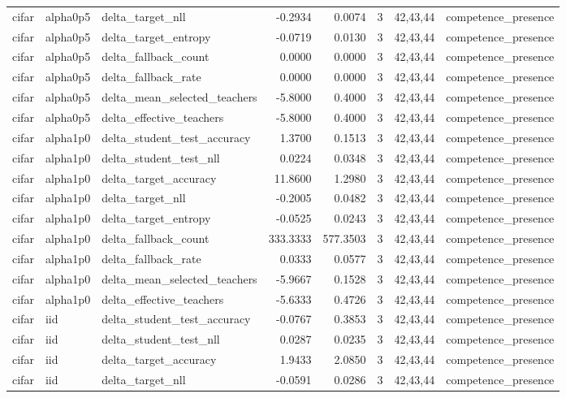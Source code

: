 \begin{tabular}{lllrrrll}
cifar & alpha0p5 & delta\_target\_nll & -0.2934 & 0.0074 & 3 & 42,43,44 & competence\_presence \\
cifar & alpha0p5 & delta\_target\_entropy & -0.0719 & 0.0130 & 3 & 42,43,44 & competence\_presence \\
cifar & alpha0p5 & delta\_fallback\_count & 0.0000 & 0.0000 & 3 & 42,43,44 & competence\_presence \\
cifar & alpha0p5 & delta\_fallback\_rate & 0.0000 & 0.0000 & 3 & 42,43,44 & competence\_presence \\
cifar & alpha0p5 & delta\_mean\_selected\_teachers & -5.8000 & 0.4000 & 3 & 42,43,44 & competence\_presence \\
cifar & alpha0p5 & delta\_effective\_teachers & -5.8000 & 0.4000 & 3 & 42,43,44 & competence\_presence \\
cifar & alpha1p0 & delta\_student\_test\_accuracy & 1.3700 & 0.1513 & 3 & 42,43,44 & competence\_presence \\
cifar & alpha1p0 & delta\_student\_test\_nll & 0.0224 & 0.0348 & 3 & 42,43,44 & competence\_presence \\
cifar & alpha1p0 & delta\_target\_accuracy & 11.8600 & 1.2980 & 3 & 42,43,44 & competence\_presence \\
cifar & alpha1p0 & delta\_target\_nll & -0.2005 & 0.0482 & 3 & 42,43,44 & competence\_presence \\
cifar & alpha1p0 & delta\_target\_entropy & -0.0525 & 0.0243 & 3 & 42,43,44 & competence\_presence \\
cifar & alpha1p0 & delta\_fallback\_count & 333.3333 & 577.3503 & 3 & 42,43,44 & competence\_presence \\
cifar & alpha1p0 & delta\_fallback\_rate & 0.0333 & 0.0577 & 3 & 42,43,44 & competence\_presence \\
cifar & alpha1p0 & delta\_mean\_selected\_teachers & -5.9667 & 0.1528 & 3 & 42,43,44 & competence\_presence \\
cifar & alpha1p0 & delta\_effective\_teachers & -5.6333 & 0.4726 & 3 & 42,43,44 & competence\_presence \\
cifar & iid & delta\_student\_test\_accuracy & -0.0767 & 0.3853 & 3 & 42,43,44 & competence\_presence \\
cifar & iid & delta\_student\_test\_nll & 0.0287 & 0.0235 & 3 & 42,43,44 & competence\_presence \\
cifar & iid & delta\_target\_accuracy & 1.9433 & 2.0850 & 3 & 42,43,44 & competence\_presence \\
cifar & iid & delta\_target\_nll & -0.0591 & 0.0286 & 3 & 42,43,44 & competence\_presence \\

\end{tabular}
